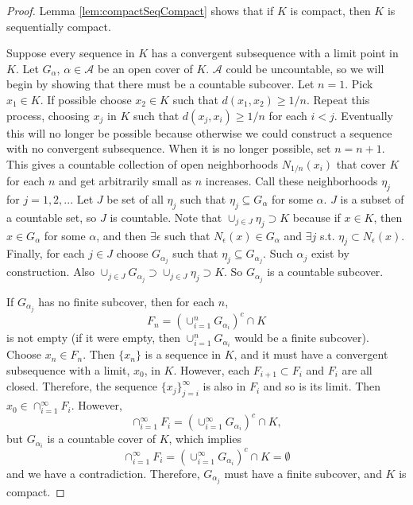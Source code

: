\begin{proof}
  Lemma \ref{lem:compactSeqCompact} shows that if $K$ is compact, then
  $K$ is sequentially compact.
  
  Suppose every sequence in $K$ has a convergent subsequence with a
  limit point in $K$. Let $G_{\alpha}$, $\alpha \in \mathcal{A}$ be an
  open cover of $K$. $\mathcal{A}$ could be uncountable, so we will
  begin by showing that there must be a countable subcover.  Let
  $n=1$. Pick $x_1 \in K$. If possible choose $x_2 \in K$ such that
  $d(x_1,x_2) \geq 1/n$. Repeat this process, choosing $x_j$ in $K$
  such that $d(x_j,x_i) \geq 1/n$ for each $i<j$. Eventually this will
  no longer be possible because otherwise we could construct a
  sequence with no convergent subsequence. When it is no longer
  possible, set $n = n+1$. This gives a countable collection of open
  neighborhoods $N_{1/n}(x_i)$ that cover $K$ for each $n$ and get
  arbitrarily small as $n$ increases. Call these neighborhoods
  $\eta_j$ for $j = 1,2,..$. Let $J$ be set of all $\eta_j$ such that
  $\eta_j \subseteq G_\alpha$ for some $\alpha$. $J$ is a subset of a
  countable set, so $J$ is countable. Note that $\cup_{j \in J} \eta_j
  \supset K$ because if $x \in K$, then $x \in G_\alpha$ for some
  $\alpha$, and then $\exists \epsilon$ such that $N_{\epsilon}(x) \in
  G_{\alpha}$ and $\exists j$ s.t. $\eta_j \subset N_{\epsilon}(x)$.
  Finally, for each $j \in J$ choose $G_{\alpha_j}$ such that $\eta_j
  \subseteq G_{\alpha_j}$. Such $\alpha_j$ exist by construction. Also
  $\cup_{j \in J} G_{\alpha_j} \supset \cup_{j \in J} \eta_j \supset
  K$. So $G_{\alpha_j}$ is a countable subcover.

  If $G_{\alpha_j}$ has no finite subcover, then for each $n$, 
  \[ F_n = \left(\cup_{i=1}^n G_{\alpha_i}\right)^c \cap K \] is not
  empty (if it were empty, then $\cup_{i=1}^n G_{\alpha_i}$ would be a
  finite subcover). Choose $x_n \in F_n$. Then $\{x_n\}$ is a sequence in $K$,
  and it must have a convergent subsequence with a limit, $x_0$, in
  $K$. However, each $F_{i+1} \subset F_i$ and $F_i$ are all
  closed. Therefore, the sequence $\{x_j\}_{j=i}^\infty$ is also in
  $F_i$ and so is its limit. Then $x_0 \in \cap_{i=1}^\infty
  F_i$. However, 
  \[ \cap_{i=1}^\infty F_i = \left(\cup_{i=1}^\infty
    G_{\alpha_i}\right)^c \cap K, \]  
  but $G_{\alpha_i}$ is a countable cover of $K$, which implies 
  \[ \cap_{i=1}^\infty F_i = \left(\cup_{i=1}^\infty
    G_{\alpha_i}\right)^c \cap K = \emptyset\] 
  and we have a contradiction. Therefore, $G_{\alpha_j}$ must have a
  finite subcover, and $K$ is compact.
\end{proof}

